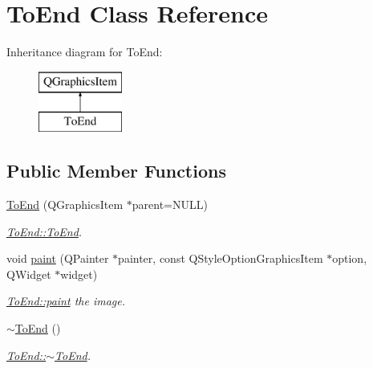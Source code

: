 \hypertarget{class_to_end}{\section{To\-End Class Reference}
\label{class_to_end}
}
Inheritance diagram for To\-End\-:\begin{figure}[H]
\begin{center}
\leavevmode
\includegraphics[height=2.000000cm]{class_to_end}
\end{center}
\end{figure}
\subsection*{Public Member Functions}
\begin{DoxyCompactItemize}
\item 
\hyperlink{class_to_end_a3581753bcd93c6124cede301373eec4b}{To\-End} (Q\-Graphics\-Item $\ast$parent=N\-U\-L\-L)
\begin{DoxyCompactList}\small\item\em \hyperlink{class_to_end_a3581753bcd93c6124cede301373eec4b}{To\-End\-::\-To\-End}. \end{DoxyCompactList}\item 
void \hyperlink{class_to_end_a8f9864d32e58c3cf2204299e63bbeeda}{paint} (Q\-Painter $\ast$painter, const Q\-Style\-Option\-Graphics\-Item $\ast$option, Q\-Widget $\ast$widget)
\begin{DoxyCompactList}\small\item\em \hyperlink{class_to_end_a8f9864d32e58c3cf2204299e63bbeeda}{To\-End\-::paint} the image. \end{DoxyCompactList}\item 
\hypertarget{class_to_end_aada516ddbf070dd4e961b3a49a242a0c}{\hyperlink{class_to_end_aada516ddbf070dd4e961b3a49a242a0c}{$\sim$\-To\-End} ()}\label{class_to_end_aada516ddbf070dd4e961b3a49a242a0c}

\begin{DoxyCompactList}\small\item\em \hyperlink{class_to_end_aada516ddbf070dd4e961b3a49a242a0c}{To\-End\-::$\sim$\-To\-End}. \end{DoxyCompactList}\end{DoxyCompactItemize}
